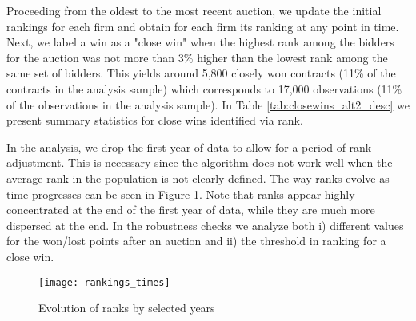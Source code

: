 Proceeding from the oldest to the most recent auction, we update the initial rankings for each firm and obtain for each firm its ranking at any point in time. Next, we label a win as a "close win" when the highest rank among the bidders for the auction was not more than 3\% higher than the lowest rank among the same set of bidders. This yields around  5,800 closely won contracts (11\% of the contracts in the analysis sample) which corresponds to 17,000 observations (11\% of the observations in the analysis sample). In Table \ref{tab:closewins_alt2_desc} we present summary statistics for close wins identified via rank.



In the analysis, we drop the first year of data to allow for a period of rank adjustment. This is necessary since the algorithm does not work well when the average rank in the population is not clearly defined. The way ranks evolve as time progresses  can be seen in Figure \ref{fig:rankings_times}. Note that ranks appear highly concentrated at the end of the first year of data, while they are much more dispersed at the end. In the robustness checks we analyze both i) different values for the won/lost points after an auction and ii) the threshold in ranking for a close win.

\begin{figure}
  \texttt{[image: rankings\_times]}
  \caption{Evolution of ranks by selected years}
  \label{fig:rankings_times}
  \vskip 0.5mm
  { \footnotesize \underline{ } \par}
\end{figure}


